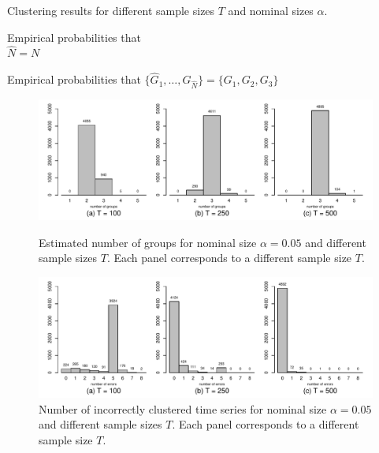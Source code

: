 \documentclass[a4paper,12pt]{article}
\begin{document}
\addtocounter{table}{-1} 
\begin{table}[b!]
\footnotesize{
\begin{center}
\caption{Clustering results for different sample sizes $T$ and nominal sizes $\alpha$.}\label{tab:clustering}
\begin{subtable}[b]{0.48\textwidth}
\centering
\caption{Empirical probabilities that \\ $\widehat{N} = N$}\label{tab:clustering:1}
\renewcommand{\arraystretch}{1.2}

\end{subtable}
\begin{subtable}[b]{0.48\textwidth}
\centering
\caption{\centering Empirical probabilities that $\{ \widehat{G}_1,\ldots,\widehat{G}_{\widehat{N}}\} = \{ G_1,G_2,G_3\}$}\label{tab:clustering:2}
\renewcommand{\arraystretch}{1.2}

\end{subtable}
\end{center}}
\vspace{-0.5cm}
\end{table}

\begin{figure}[t!]
\centering
\includegraphics[width=\textwidth]{output/plots/sim/histograms_groups}
\caption{Estimated number of groups for nominal size $\alpha = 0.05$ and different sample sizes $T$. Each panel corresponds to a different sample size $T$.}
\label{fig:clustering:1}
\includegraphics[width=\textwidth]{output/plots/sim/histograms_errors}
\caption{Number of incorrectly clustered time series for nominal size $\alpha = 0.05$ and different sample sizes $T$. Each panel corresponds to a different sample size $T$.}\label{fig:clustering:2}
\end{figure}
\end{document}
